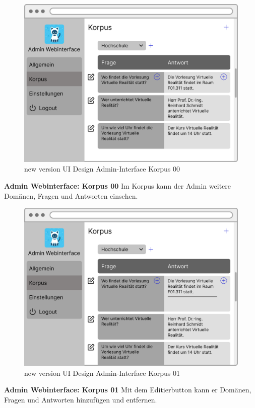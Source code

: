 \begin{figure}[H]
    \centering
    \includegraphics[width=1.0\textwidth]{bilder/new vers. UI Design/Korpus/Admin Interface 00.png}
    \caption{new version UI Design Admin-Interface Korpus 00}
    \label{fig:new version UI Design Admin-Interface Korpus 00}
\end{figure}
\noindent  \textbf{Admin Webinterface: Korpus 00} \newline
Im Korpus kann der Admin weitere Domänen, Fragen und Antworten einsehen.

\begin{figure}[H]
    \centering
    \includegraphics[width=1.0\textwidth]{bilder/new vers. UI Design/Korpus/Admin Interface 01.png}
    \caption{new version UI Design Admin-Interface Korpus 01}
    \label{fig:new version UI Design Admin-Interface Korpus 01}
\end{figure}
\noindent \textbf{Admin Webinterface: Korpus 01} \newline
Mit dem Editierbutton kann er Domänen, Fragen und Antworten hinzufügen und entfernen.

